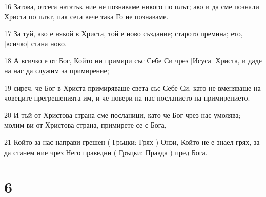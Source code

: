 \par 16 Затова, отсега нататък ние не познаваме никого по плът; ако и да сме познали Христа по плът, пак сега вече така Го не познаваме.
\par 17 За туй, ако е някой в Христа, той е ново създание; старото премина; ето, [всичко] стана ново.
\par 18 А всичко е от Бог, Който ни примири със Себе Си чрез [Исуса] Христа, и даде на нас да служим за примирение;
\par 19 сиреч, че Бог в Христа примиряваше света със Себе Си, като не вменяваше на човеците прегрешенията им, и че повери на нас посланието на примирението.
\par 20 И тъй от Христова страна сме посланици, като че Бог чрез нас умолява; молим ви от Христова страна, примирете се с Бога,
\par 21 Който за нас направи грешен ( Гръцки: Грях ) Онзи, Който не е знаел грях, за да станем ние чрез Него праведни ( Гръцки: Правда ) пред Бога.

\chapter{6}

